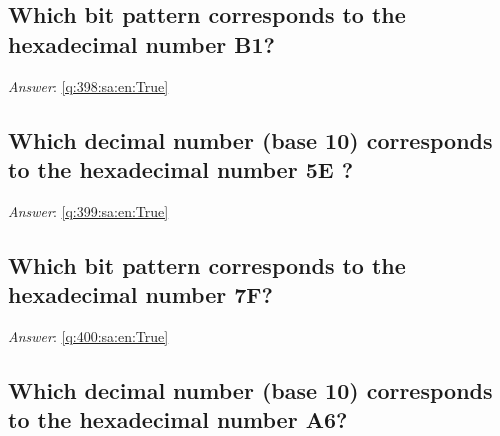 \documentclass[a4paper,11pt,oneside]{article}
\begin{document}
\begin{sloppypar}
\subsection{Which bit pattern corresponds to the hexadecimal number B1?}

\label{q:398:sa:en:False}

\vspace{2cm}

\noindent\makebox[\textwidth]{\hrulefill}

\vspace{1cm}

\textit{Answer}: \autoref{q:398:sa:en:True}



\subsection{Which decimal number (base 10) corresponds to the hexadecimal number  5E ?}

\label{q:399:sa:en:False}

\vspace{2cm}

\noindent\makebox[\textwidth]{\hrulefill}

\vspace{1cm}

\textit{Answer}: \autoref{q:399:sa:en:True}



\subsection{Which bit pattern corresponds to the hexadecimal number 7F?}

\label{q:400:sa:en:False}

\vspace{2cm}

\noindent\makebox[\textwidth]{\hrulefill}

\vspace{1cm}

\textit{Answer}: \autoref{q:400:sa:en:True}



\subsection{Which decimal number (base 10) corresponds to the hexadecimal number  A6?}

\label{q:401:sa:en:False}

\vspace{2cm}


\end{sloppypar}
\end{document}
